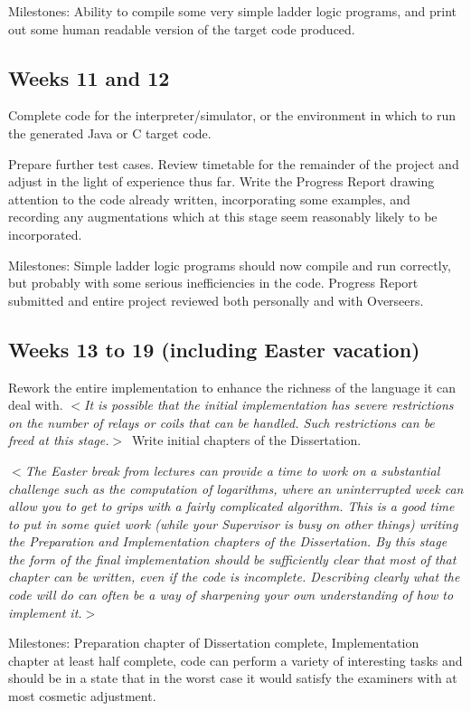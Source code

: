 \documentclass[12pt]{article}
\newcommand{\al}{$<$}
\newcommand{\ar}{$>$}
\begin{document}
Milestones: Ability to compile some very simple ladder logic programs,
and print out some human readable version of the target code produced.


\subsection*{Weeks 11 and 12}

Complete code for the interpreter/simulator, or the environment in
which to run the generated Java or C target code.

Prepare further test cases.  Review timetable for the remainder of the
project and adjust in the light of experience thus far.  Write the
Progress Report drawing attention to the code already written,
incorporating some examples, and recording any augmentations which at
this stage seem reasonably likely to be incorporated.

Milestones: Simple ladder logic programs should now compile and run
correctly, but probably with some serious inefficiencies in the code.
Progress Report submitted and entire project reviewed both personally
and with Overseers.


\subsection*{Weeks 13 to 19 (including Easter vacation)}

Rework the entire implementation to enhance the
richness of the language it can deal with. \al\emph{It is possible that
the initial implementation has severe restrictions on the number of
relays or coils that can be handled. Such restrictions can be freed at
this stage.}\ar\  Write initial chapters of the Dissertation.

\al\emph{The Easter break from lectures can provide a time to work on a
substantial challenge such as the computation of logarithms, where an
uninterrupted week can allow you to get to grips with a fairly
complicated algorithm.  This is a good time to put in some quiet work
(while your Supervisor is busy on other things) writing the
Preparation and Implementation chapters of the Dissertation.  By this
stage the form of the final implementation should be sufficiently
clear that most of that chapter can be written, even if the code is
incomplete.  Describing clearly what the code will do can often be a
way of sharpening your own understanding of how to implement it.}\ar

Milestones: Preparation chapter of Dissertation complete,
Implementation chapter at least half complete, code can perform a
variety of interesting tasks and should be in a state that in the
worst case it would satisfy the examiners with at most cosmetic
adjustment.
\end{document}
